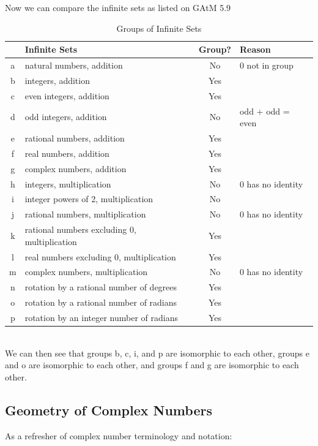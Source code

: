 \documentclass[12pt, letterpaper]{article}
\begin{document}
Now we can compare the infinite sets as listed on GAtM 5.9
\begin{table}[h]
    \centering
    \begin{tabular}{|c|l|c|l|}
        \hline
        & \textbf{Infinite Sets} & \textbf{Group?} & \textbf{Reason} \\ \hline
        a & natural numbers, addition & No & 0 not in group \\ \hline
        b & integers, addition & Yes & \\ \hline
        c & even integers, addition & Yes & \\ \hline
        d & odd integers, addition & No & odd + odd = even \\ \hline
        e & rational numbers, addition & Yes & \\ \hline
        f & real numbers, addition & Yes & \\ \hline
        g & complex numbers, addition & Yes & \\ \hline
        h & integers, multiplication & No & 0 has no identity \\ \hline
        i & integer powers of 2, multiplication & No & \\ \hline
        j & rational numbers, multiplication & No & 0 has no identity \\ \hline
        k & rational numbers excluding 0, multiplication & Yes & \\ \hline
        l & real numbers excluding 0, multiplication & Yes & \\ \hline
        m & complex numbers, multiplication & No & 0 has no identity \\ \hline
        n & rotation by a rational number of degrees & Yes & \\ \hline
        o & rotation by a rational number of radians & Yes & \\ \hline
        p & rotation by an integer number of radians & Yes & \\ \hline
    \end{tabular}
    \caption{Groups of Infinite Sets}
    \label{tab:groups_infinite_sets}
\end{table}\\
We can then see that groups b, c, i, and p are isomorphic to each other, groups e and o are isomorphic to each other, and groups f and g are isomorphic to each other.

\subsection{Geometry of Complex Numbers}
As a refresher of complex number terminology and notation:
\vspace{1em}\\
\end{document}
